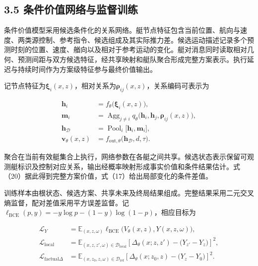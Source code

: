\documentclass[
  11pt,
  fontset=none]{ctexart}
\begin{document}
\subsection{3.5
条件价值网络与监督训练}\label{ux6761ux4ef6ux4ef7ux503cux7f51ux7edcux4e0eux76d1ux7763ux8badux7ec3}

条件价值模型采用候选条件化的关系网络。艇节点特征包含当前位置、航向与速度、两类源控制、参考指令、候选组成及其实际推力差。候选运动描述记录多个预测时刻的位置、速度、艏向以及相对于参考运动的变化。艇对消息同时读取相对几何、预测间距与双方候选特征，经共享映射和艇队聚合形成完整方案表示。执行延迟与持续时间作为方案级特征参与最终价值输出。

记节点特征为\(\boldsymbol\xi_i(x,z)\)，相对关系为\(\boldsymbol\rho_{ij}(x,z)\)，关系编码可表示为

\[
\begin{aligned}
\boldsymbol h_i&=f_\theta\bigl(\boldsymbol\xi_i(x,z)\bigr),\\
\boldsymbol m_i&=\operatorname{Agg}_{j\ne i}
q_\theta\bigl(\boldsymbol h_i,\boldsymbol h_j,
\boldsymbol\rho_{ij}(x,z)\bigr),\\
\boldsymbol h_{\mathcal D}
&=\operatorname{Pool}_{i}
\bigl[\boldsymbol h_i,\boldsymbol m_i\bigr],\\
\boldsymbol v_\theta(x,z)
&=f_{\mathrm{out},\theta}
\bigl(\boldsymbol h_{\mathcal D},d,\tau\bigr).
\end{aligned}
\tag{21}
\]

聚合在当前有效艇集合上执行，网络参数在各艇之间共享。候选状态表示保留可观测艇标识及控制对应关系，输出经概率映射形成事实价值和条件结果估计。式（20）据此得到完整方案价值，式（17）给出局部变化的条件差值。

训练样本由根状态、候选方案、共享未来及终局结果组成。完整结果采用二元交叉熵监督，配对差值采用平方误差监督。记\(\ell_{\mathrm{BCE}}(p,y)=-y\log p-(1-y)\log(1-p)\)，相应目标为

\[
\begin{aligned}
\mathcal L_Y
&=\mathbb E_{(x,z,\omega)}
\ell_{\mathrm{BCE}}\bigl(V_\theta(x,z),Y(x,z,\omega)\bigr),\\
\mathcal L_{\mathrm{local}}
&=\mathbb E_{(x,z,z',\omega)\in\mathcal D_{\mathrm{local}}}
\left[\Delta_\theta(x;z,z')-
\bigl(Y_{z'}-Y_z\bigr)\right]^2,\\
\mathcal L_{\mathrm{factual}\Delta}
&=\mathbb E_{(x,z_0,z,\omega)\in\mathcal D_{\mathrm{ref}}}
\left[\Delta_\theta(x;z_0,z)-
\bigl(Y_z-Y_0\bigr)\right]^2 .
\end{aligned}
\tag{22}
\]
\end{document}
